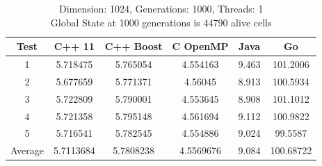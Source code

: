 \documentclass[11pt]{article} %
\begin{document}
\begin{table}[ht]

\caption{Dimension: 1024, Generations: 1000, Threads: 1\\Global State at 1000 generations is 44790 alive cells} %

\centering %

\begin{tabular}{c c c c c c} %

\hline\hline %

Test & C++ 11 & C++ Boost & C OpenMP & Java & Go \\ [0.5ex] %


\hline %

1 & 5.718475 & 5.765054	& 4.554163 & 9.463 & 101.2006 \\
2 & 5.677659 & 5.771371 & 4.56045 & 8.913 & 100.5934 \\
3 & 5.722809 & 5.790001	& 4.553645 & 8.908 & 101.1012 \\
4 & 5.721358 & 5.795148 & 4.561694 & 9.112 & 100.9822 \\
5 & 5.716541 & 5.782545 & 4.554886 & 9.024 & 99.5587 \\
Average & 5.7113684 & 5.7808238 & 4.5569676 & 9.084 & 100.68722 \\ [1ex]

\hline %

\end{tabular}

\end{table}
\end{document}
